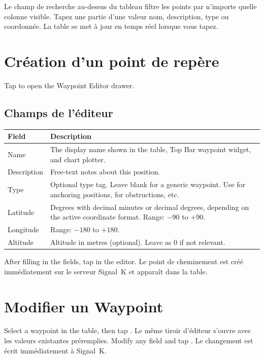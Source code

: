 Le champ de recherche au-dessus du tableau filtre les points par n'importe quelle colonne visible.
Tapez une partie d'une valeur nom, description, type ou coordonnée.
La table se met à jour en temps réel lorsque vous tapez.

\section{Création d'un point de repère}

Tap  to open the Waypoint Editor drawer.


\subsection{Champs de l'éditeur}

\begin{longtable}{L{3cm} L{10.7cm}}
\toprule
{}
{\sffamily\bfseries\color{white} Field} &
{\sffamily\bfseries\color{white} Description} \\
\midrule
Name & The display name shown in the table, Top Bar waypoint widget, and chart plotter. \\
Description & Free-text notes about this position. \\
Type & Optional type tag. Leave blank for a generic waypoint. Use  for anchoring positions,  for obstructions, etc. \\
Latitude & Degrees with decimal minutes or decimal degrees, depending on the active coordinate format. Range: $-90$ to $+90$. \\
Longitude & Range: $-180$ to $+180$. \\
Altitude & Altitude in metres (optional). Leave as 0 if not relevant. \\
\bottomrule
\end{longtable}

After filling in the fields, tap  in the editor.
Le point de cheminement est créé immédiatement sur le serveur Signal~K et apparaît dans la table.

\section{Modifier un Waypoint}

Select a waypoint in the table, then tap .
Le même tiroir d'éditeur s'ouvre avec les valeurs existantes préremplies.
Modify any field and tap .
Le changement est écrit immédiatement à Signal~K.

